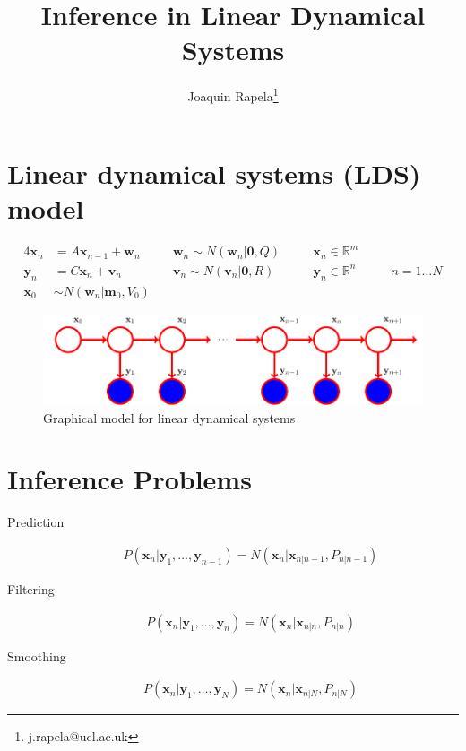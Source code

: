 \documentclass[12pt]{article}
\title{Inference in Linear Dynamical Systems}
\author{Joaquin Rapela\thanks{j.rapela@ucl.ac.uk}}
\begin{document}
\maketitle

\section{Linear dynamical systems (LDS) model}
\label{sec:ldsModel}

\begin{alignat*}{4}
    \mathbf{x}_n &= A \mathbf{x}_{n-1}+\mathbf{w}_n\quad && \mathbf{w}_n\sim
    N(\mathbf{w}_n|\mathbf{0}, Q)\quad && \mathbf{x}_n\in\mathbb{R}^m&&\\
    \mathbf{y}_n &= C \mathbf{x}_{n}+\mathbf{v}_n\quad && \mathbf{v}_n\sim
    N(\mathbf{v}_n|\mathbf{0}, R)\quad && \mathbf{y}_n\in\mathbb{R}^n&&\quad n=1\ldots N\\
    \mathbf{x}_0 &\sim N(\mathbf{w}_n|\mathbf{m}_0, V_0) && &&
\end{alignat*}

\begin{figure}[h]
\begin{center}
    \includegraphics[width=5in]{figures/ldsGraphicalModel.pdf}
    \caption{Graphical model for linear dynamical systems}
    \label{fig:ldsGraphicalModel}
\end{center}
\end{figure}

\section{Inference Problems}
\label{sec:inferenceProblems}

\begin{description}
    \item[Prediction]
        \begin{align}
            P(\mathbf{x}_n|\mathbf{y}_1,\ldots,\mathbf{y}_{n-1})=N(\mathbf{x}_n|\mathbf{x}_{n|n-1},P_{n|n-1})\label{eq:prediction}
        \end{align}
    \item[Filtering]
        \begin{align}
            P(\mathbf{x}_n|\mathbf{y}_1,\ldots,\mathbf{y}_{n})=N(\mathbf{x}_n|\mathbf{x}_{n|n},P_{n|n})\label{eq:filtering}
        \end{align}
    \item[Smoothing]
        \begin{align}
            P(\mathbf{x}_n|\mathbf{y}_1,\ldots,\mathbf{y}_{N})=N(\mathbf{x}_n|\mathbf{x}_{n|N},P_{n|N})\label{eq:smoothing}
        \end{align}
\end{description}
\end{document}
